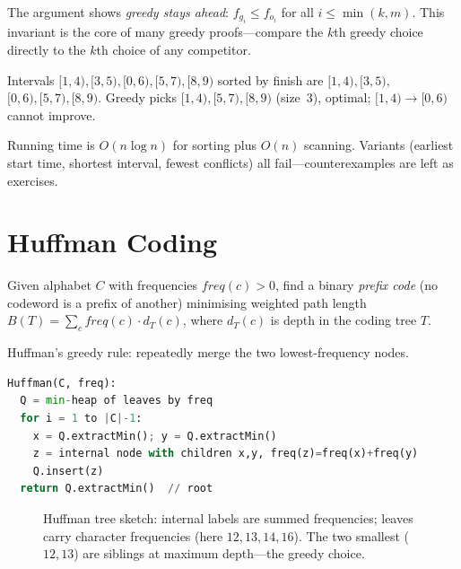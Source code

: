 The argument shows \emph{greedy stays ahead}: $f_{g_i}\le f_{o_i}$ for all $i\le\min(k,m)$. This invariant is the core of many greedy proofs---compare the $k$th greedy choice directly to the $k$th choice of any competitor.

{\sloppy
\begin{example}
Intervals $[1,4),[3,5),[0,6),[5,7),[8,9)$ sorted by finish are
$[1,4),[3,5),$ $[0,6),[5,7),[8,9)$. Greedy picks $[1,4),[5,7),[8,9)$
(size~3), optimal; $[1,4)\!\to\![0,6)$ cannot improve.
\end{example}\par}

Running time is $O(n\log n)$ for sorting plus $O(n)$ scanning. Variants (earliest start time, shortest interval, fewest conflicts) all fail---counterexamples are left as exercises.

\section{Huffman Coding}
\label{sec:huffman}

Given alphabet $C$ with frequencies $freq(c)>0$, find a binary \emph{prefix code} (no codeword is a prefix of another) minimising weighted path length $B(T)=\sum_{c}freq(c)\cdot d_T(c)$, where $d_T(c)$ is depth in the coding tree $T$.

Huffman's greedy rule: repeatedly merge the two lowest-frequency nodes.

\begin{lstlisting}[language=Python]
Huffman(C, freq):
  Q = min-heap of leaves by freq
  for i = 1 to |C|-1:
    x = Q.extractMin(); y = Q.extractMin()
    z = internal node with children x,y, freq(z)=freq(x)+freq(y)
    Q.insert(z)
  return Q.extractMin()  // root
\end{lstlisting}

\begin{figure}[h]\centering
{}
\caption{Huffman tree sketch: internal labels are summed frequencies; leaves carry character frequencies (here $12,13,14,16$). The two smallest ($12,13$) are siblings at maximum depth---the greedy choice.}
\label{fig:huffman}
\end{figure}

